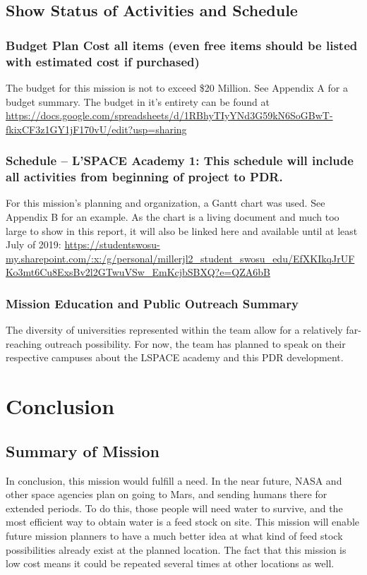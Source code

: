\documentclass[%
 portrait,
 aapm,
 mph,%
 amsmath,amssymb,
 reprint,%
]{revtex4-2}
\begin{document}
\subsection{Show Status of Activities and Schedule}

\subsubsection{Budget Plan Cost all items (even free items should be listed with
estimated cost if purchased)}
The budget for this mission is not to exceed \$20 Million. See Appendix A for a budget summary. The budget in it's entirety can be found at \url{ https://docs.google.com/spreadsheets/d/1RBhyTIyYNd3G59kN6SoGBwT-fkixCF3z1GY1jF170vU/edit?usp=sharing}

\subsubsection{Schedule – L’SPACE Academy 1: This schedule will include all activities from beginning of project to PDR.}
For this mission's planning and organization, a Gantt chart was used. See Appendix B for an example. As the chart is a living document and much too large to show in this report, it will also be linked here and available until at least July of 2019: \url{https://studentswosu-my.sharepoint.com/:x:/g/personal/millerjl2_student_swosu_edu/EfXKIkqJrUFKo3mt6Cu8ExsBv2l2GTwuVSw_EmKcjbSBXQ?e=QZA6bB}

\subsubsection{Mission Education and Public Outreach Summary}
The diversity of universities represented within the team allow for a relatively far-reaching outreach possibility. For now, the team has planned to speak on their respective campuses about the LSPACE academy and this PDR development. 

\section{\label{sec:level7}Conclusion}

\subsection{Summary of Mission}
In conclusion, this mission would fulfill a need. In the near future, NASA and other space agencies plan on going to Mars, and sending humans there for extended periods. To do this, those people will need water to survive, and the most efficient way to obtain water is a feed stock on site. This mission will enable future mission planners to have a much better idea at what kind of feed stock possibilities already exist at the planned location. The fact that this mission is low cost means it could be repeated several times at other locations as well. 
\end{document}
